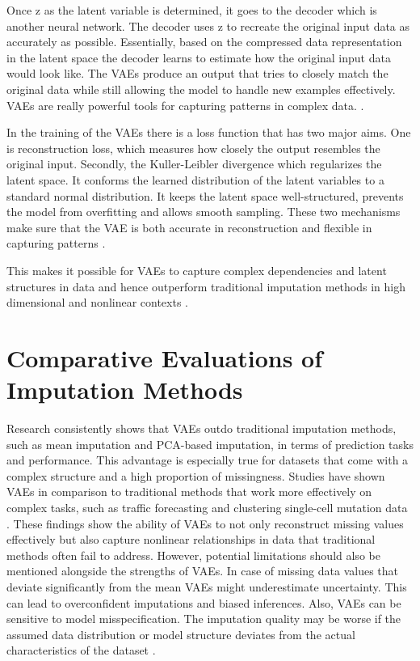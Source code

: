 \documentclass[10pt, a4paper]{article}
\begin{document}
Once z as the latent variable is determined, it goes to the decoder which is another neural network. The decoder uses z to recreate the original input data as accurately as possible. Essentially, based on the compressed data representation in the latent space the decoder learns to estimate how the original input data would look like. The VAEs produce an output that tries to closely match the original data while still allowing the model to handle new examples effectively. VAEs are really powerful tools for capturing patterns in complex data.  \parencite{Kingma & Welling, 2021}.

In the training of the VAEs there is a loss function that has two major aims. One is reconstruction loss, which measures how closely the output resembles the original input. Secondly, the Kuller-Leibler divergence which regularizes the latent space. It conforms the learned distribution of the latent variables to a standard normal distribution. It keeps the latent space well-structured, prevents the model from overfitting and allows smooth sampling. These two mechanisms make sure that the VAE is both accurate in reconstruction and flexible in capturing patterns \parencite{Aspreti & Trentin, 2020}.

This makes it possible for VAEs to capture complex dependencies and latent structures in data and hence outperform traditional imputation methods in high dimensional and nonlinear contexts  \parencite{McCoy et al., 2018; Ma et al., 2023 }.

\section{Comparative Evaluations of Imputation Methods}

Research consistently shows that VAEs outdo traditional imputation methods, such as mean imputation and PCA-based imputation, in terms of prediction tasks and performance. This advantage is especially true for datasets that come with a complex structure and a high proportion of missingness. Studies have shown VAEs in comparison to traditional methods that work more effectively on complex tasks, such as traffic forecasting and clustering single-cell mutation data \parencite{Yu et al. 2023, McCoy et al. 2018}.
These findings show the ability of VAEs to not only reconstruct missing values effectively but also capture nonlinear relationships in data that traditional methods often fail to address. However, potential limitations should also be mentioned alongside the strengths of VAEs. In case of missing data values that deviate significantly from the mean VAEs might underestimate uncertainty. This can lead to overconfident imputations and biased inferences. Also, VAEs can be sensitive to model misspecification. The imputation quality may be worse if the assumed data distribution or model structure deviates from the actual characteristics of the dataset \parencite{Roskams-Hieter & Wade, 2023}.
\end{document}
